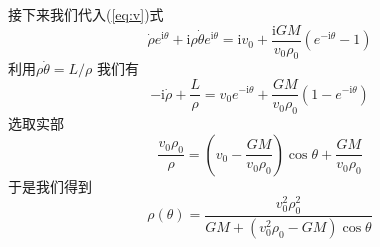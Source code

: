 \documentclass[UTF8]{ctexart}
\begin{document}
接下来我们代入(\ref{eq:v})式
\[\dot{\rho}e^{\mathrm{i}\theta}+\mathrm{i}\rho \dot{\theta} e^{\mathrm{i}\theta}=\mathrm{i} v_0+\frac{\mathrm{i} GM}{v_0\rho_0}(e^{-\mathrm{i}\theta}-1)\]
利用\(\rho \dot{\theta}=L/\rho\)
我们有
\[-\mathrm{i}\dot{\rho}+ \frac{L}{\rho} =v_0e^{-\mathrm{i} \theta}+\frac{GM}{v_0\rho_0}(1-e^{-\mathrm{i} \theta})\]
选取实部
\[\frac{v_0\rho_0}{\rho}=(v_0-\frac{GM}{v_0\rho_0})\cos\theta+\frac{GM}{v_0\rho_0}\]
于是我们得到
\[\rho(\theta)=\frac{v^2_0\rho^2_0}{GM+(v^2_0\rho_0-GM)\cos\theta}\]
\end{document}
